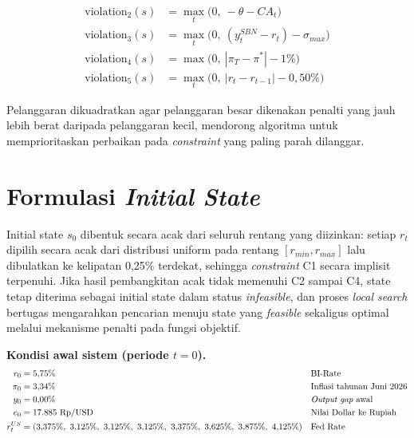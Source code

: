\begin{align*}
    \text{violation}_2(s) & = \max_{t}\!\big(0,\ -\theta - CA_t\big)                   \\
    \text{violation}_3(s) & = \max_{t}\!\big(0,\ (y_t^{SBN} - r_t) - \sigma_{max}\big) \\
    \text{violation}_4(s) & = \max\!\big(0,\ |\pi_T - \pi^{*}| - 1\%\big)              \\
    \text{violation}_5(s) & = \max_{t}\!\big(0,\ |r_t - r_{t-1}| - 0{,}50\%\big)
\end{align*}

Pelanggaran dikuadratkan agar pelanggaran besar dikenakan penalti yang jauh lebih berat daripada pelanggaran kecil, mendorong algoritma untuk memprioritaskan perbaikan pada \textit{constraint} yang paling parah dilanggar.


\section{Formulasi \textit{Initial State}}

Initial state $s_0$ dibentuk secara acak dari seluruh rentang yang diizinkan: setiap $r_t$ dipilih secara acak dari distribusi uniform pada rentang $[r_{min}, r_{max}]$ lalu dibulatkan ke kelipatan 0,25\% terdekat, sehingga \textit{constraint} C1 secara implisit terpenuhi. Jika hasil pembangkitan acak tidak memenuhi C2 sampai C4, state tetap diterima sebagai initial state dalam status \textit{infeasible}, dan proses \textit{local search} bertugas mengarahkan pencarian menuju state yang \textit{feasible} sekaligus optimal melalui mekanisme penalti pada fungsi objektif.

\medskip
\noindent\textbf{Kondisi awal sistem (periode $t = 0$).}
\begin{align*}
    r_0      & = 5{,}75\%                                                                                        &  & \text{BI-Rate}                   \\
    \pi_0    & = 3{,}34\%                                                                                        &  & \text{Inflasi tahunan Juni 2026} \\
    y_0      & = 0{,}00\%                                                                                        &  & \text{\textit{Output gap} awal}  \\
    e_0      & = 17{.}885\ \text{Rp/USD}                                                                         &  & \text{Nilai Dollar ke Rupiah}    \\
    r_t^{US} & = (3{,}375\%,\ 3{,}125\%,\ 3{,}125\%,\ 3{,}125\%,\ 3{,}375\%,\ 3{,}625\%,\ 3{,}875\%,\ 4{,}125\%) &  & \text{Fed Rate}
\end{align*}

